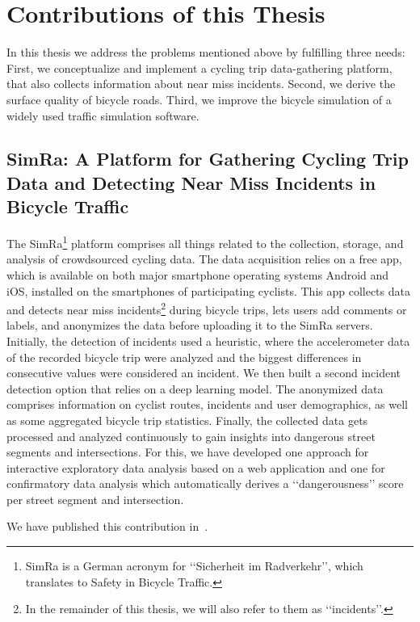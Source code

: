 \section{Contributions of this Thesis}
\label{sec:contributions}
In this thesis we address the problems mentioned above by fulfilling three needs:
First, we conceptualize and implement a cycling trip data-gathering platform, that also collects information about near miss incidents.
Second, we derive the surface quality of bicycle roads.
Third, we improve the bicycle simulation of a widely used traffic simulation software.

\subsection{SimRa: A Platform for Gathering Cycling Trip Data and Detecting Near Miss Incidents in Bicycle Traffic}
\label{subsec:simra_contribution}
The SimRa\footnote{SimRa is a German acronym for ‘‘Sicherheit im Radverkehr’’, which translates to Safety in Bicycle Traffic.} platform comprises all things related to the collection, storage, and analysis of crowdsourced cycling data.
The data acquisition relies on a free app, which is available on both major smartphone operating systems Android and iOS, installed on the smartphones of participating cyclists.
This app collects data and detects near miss incidents\footnote{In the remainder of this thesis, we will also refer to them as ‘‘incidents’’.} during bicycle trips, lets users add comments or labels, and anonymizes the data before uploading it to the SimRa servers.
Initially, the detection of incidents used a heuristic, where the accelerometer data of the recorded bicycle trip were analyzed and the biggest differences in consecutive values were considered an incident.
We then built a second incident detection option that relies on a deep learning model.
The anonymized data comprises information on cyclist routes, incidents and user demographics, as well as some aggregated bicycle trip statistics.
Finally, the collected data gets processed and analyzed continuously to gain insights into dangerous street segments and intersections.
For this, we have developed one approach for interactive exploratory data analysis based on a web application and one for confirmatory data analysis which automatically derives a ‘‘dangerousness’’ score per street segment and intersection. 

We have published this contribution in~\cite{karakaya2020simra,karakaya2022cyclesense}.

